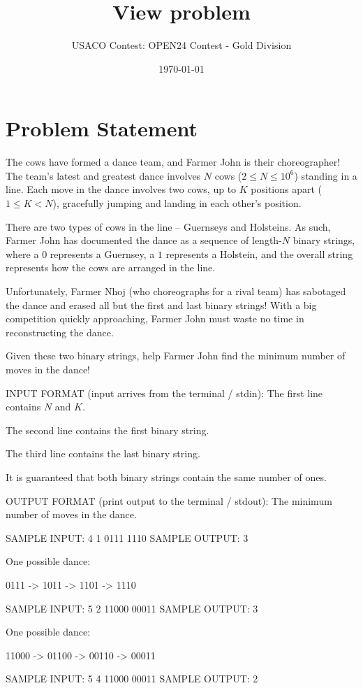 \documentclass[12pt]{article}
\title{View problem}
\author{USACO Contest: OPEN24 Contest - Gold Division}
\date{\today}
\begin{document}
\maketitle

\section*{Problem Statement}


The cows have formed a dance team, and Farmer John is their choreographer! The
team's latest and greatest dance involves $N$ cows ($2 \le N \le 10^6$) standing
in a line. Each move in the dance involves two cows, up to $K$ positions apart
($1 \le K < N$), gracefully jumping and landing in each other's position.

There are two types of cows in the line – Guernseys and Holsteins. As such,
Farmer John has documented the dance as a sequence of length-$N$ binary
strings, where a $0$ represents a Guernsey, a $1$ represents a Holstein, and
the overall string represents how the cows are arranged in the line.

Unfortunately, Farmer Nhoj (who choreographs for a rival team) has sabotaged the
dance and erased all but the first and last binary strings! With a big
competition quickly approaching, Farmer John must waste no time in
reconstructing the dance.

Given these two binary strings, help Farmer John find the minimum number of
moves in the dance!

INPUT FORMAT (input arrives from the terminal / stdin):
The first line contains $N$ and $K$.

The second line contains the first binary string.

The third line contains the last binary string.

It is guaranteed that both binary strings contain the same number of ones.

OUTPUT FORMAT (print output to the terminal / stdout):
The minimum number of moves in the dance.

SAMPLE INPUT:
4 1
0111
1110
SAMPLE OUTPUT: 
3

One possible dance:


0111 -> 1011 -> 1101 -> 1110

SAMPLE INPUT:
5 2
11000
00011
SAMPLE OUTPUT: 
3

One possible dance:


11000 -> 01100 -> 00110 -> 00011

SAMPLE INPUT:
5 4
11000
00011
SAMPLE OUTPUT: 
2
\end{document}
